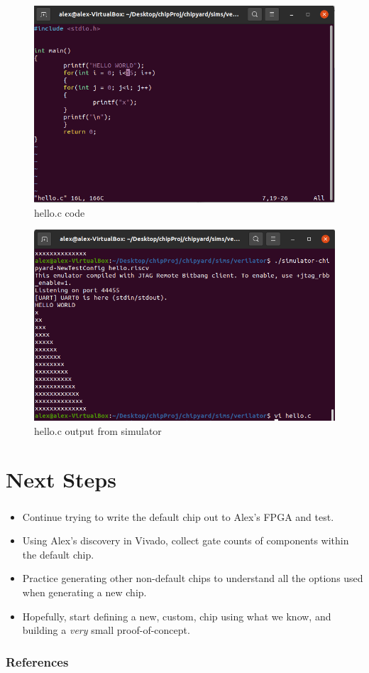 \documentclass{../weeklyslides}
\begin{document}
\begin{frame}
	
\begin{figure}
	\centering
	\includegraphics[width=0.5\linewidth]{helloC}
	\caption{hello.c code}
	\label{fig:helloc}
\end{figure}

\begin{figure}
	\centering
	\includegraphics[width=0.5\linewidth]{helloCout}
	\caption{hello.c output from simulator}
	\label{fig:hellocout}
\end{figure}

	
\end{frame}




\section{Next Steps}\label{sec:Next_Steps}
\begin{frame}
  \frametitle{}
  \begin{itemize}
  \item Continue trying to write the default chip out to Alex's FPGA and test.
  \item Using Alex's discovery in Vivado, collect gate counts of components within the default chip.
  \item Practice generating other non-default chips to understand all the options used when generating a new chip.
  \item Hopefully, start defining a new, custom, chip using what we know, and building a \emph{very} small proof-of-concept.
  \end{itemize}
\end{frame}

\begin{frame}
  \frametitle{References}
  \printbibliography[heading=bibintoc]{}
\end{frame}
\end{document}
